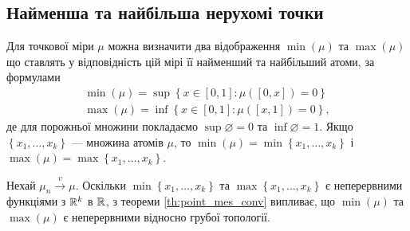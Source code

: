 \subsection{Найменша та найбільша нерухомі точки}
Для точкової міри $\mu$ можна визначити два відображення
$\min(\mu)$ та $\max(\mu)$ що ставлять у відповідність
цій мірі її найменший та найбільший атоми, за формулами
\begin{gather}
    \min(\mu) = \sup \left\{x\in[0,1] :\mu([0, x]) = 0 \right\} \\
    \max(\mu) = \inf \left\{x\in[0,1] :\mu([x, 1]) = 0 \right\},
\end{gather}
де для порожньої множини
покладаємо $\sup \varnothing = 0$ та $\inf \varnothing = 1$.
Якщо $\left\{x_1,\dots,x_k \right\}$ --- множина атомів $\mu$,
то  
$\min(\mu) = \min\left\{x_1,\dots,x_k \right\}$ і 
$\max(\mu) = \max\left\{x_1,\dots,x_k \right\}$.

Нехай $\mu_n \overset{v}{\longrightarrow} \mu$.
Оскільки $\min\left\{x_1,\dots,x_k \right\}$ та
$\max\left\{x_1,\dots,x_k \right\}$ є неперервними функціями з $\mathbb{R}^k$ в $\mathbb{R}$, 
з теореми \ref{th:point_mes_conv}
випливає, що $\min(\mu)$ та $\max(\mu)$ 
є неперервними відносно грубої топології.

